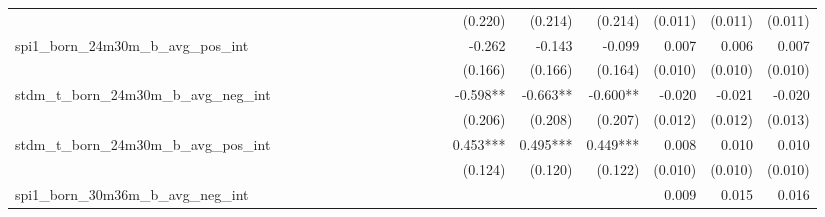 \begin{tabular}{lrrrrrrrrrrrrrrrrrr}
                                            &              &              &              &              &              &              &              &              &               &              &              &               &      (0.220) &      (0.214) &       (0.214) &      (0.011) &      (0.011) &       (0.011) \\ 
spi1\_born\_24m30m\_b\_avg\_pos\_int        &              &              &              &              &              &              &              &              &               &              &              &               &       -0.262 &       -0.143 &        -0.099 &        0.007 &        0.006 &         0.007 \\ 
                                            &              &              &              &              &              &              &              &              &               &              &              &               &      (0.166) &      (0.166) &       (0.164) &      (0.010) &      (0.010) &       (0.010) \\ 
stdm\_t\_born\_24m30m\_b\_avg\_neg\_int     &              &              &              &              &              &              &              &              &               &              &              &               &     -0.598** &     -0.663** &      -0.600** &       -0.020 &       -0.021 &        -0.020 \\ 
                                            &              &              &              &              &              &              &              &              &               &              &              &               &      (0.206) &      (0.208) &       (0.207) &      (0.012) &      (0.012) &       (0.013) \\ 
stdm\_t\_born\_24m30m\_b\_avg\_pos\_int     &              &              &              &              &              &              &              &              &               &              &              &               &     0.453*** &     0.495*** &      0.449*** &        0.008 &        0.010 &         0.010 \\ 
                                            &              &              &              &              &              &              &              &              &               &              &              &               &      (0.124) &      (0.120) &       (0.122) &      (0.010) &      (0.010) &       (0.010) \\ 
spi1\_born\_30m36m\_b\_avg\_neg\_int        &              &              &              &              &              &              &              &              &               &              &              &               &              &              &               &        0.009 &        0.015 &         0.016 \\ 

\end{tabular}
